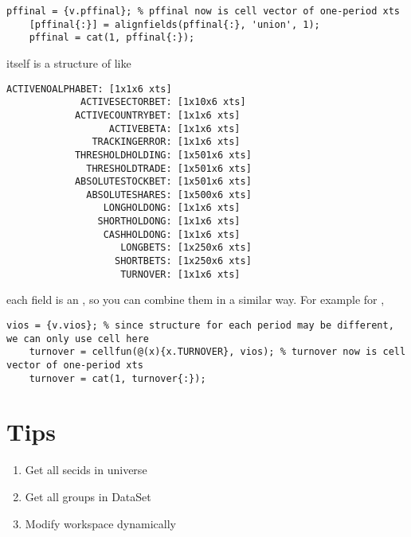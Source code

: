 \begin{lstlisting}[numbers=none]  
    pffinal = {v.pffinal}; % pffinal now is cell vector of one-period xts
    [pffinal{:}] = alignfields(pffinal{:}, 'union', 1);
    pffinal = cat(1, pffinal{:});
\end{lstlisting} 
 
 itself is a structure of like
 
\begin{lstlisting}[numbers=none] 
		    ACTIVENOALPHABET: [1x1x6 xts]
		     ACTIVESECTORBET: [1x10x6 xts]
		    ACTIVECOUNTRYBET: [1x1x6 xts]
		          ACTIVEBETA: [1x1x6 xts]
		       TRACKINGERROR: [1x1x6 xts]
		    THRESHOLDHOLDING: [1x501x6 xts]
		      THRESHOLDTRADE: [1x501x6 xts]
		    ABSOLUTESTOCKBET: [1x501x6 xts]
		      ABSOLUTESHARES: [1x500x6 xts]
		         LONGHOLDONG: [1x1x6 xts]
		        SHORTHOLDONG: [1x1x6 xts]
		         CASHHOLDONG: [1x1x6 xts]
		            LONGBETS: [1x250x6 xts]
		           SHORTBETS: [1x250x6 xts]
		            TURNOVER: [1x1x6 xts]
\end{lstlisting} 
 
each field is an , so you can combine them in a similar way. 
For example for , 

\begin{lstlisting}[numbers=none] 
    vios = {v.vios}; % since structure for each period may be different, we can only use cell here
    turnover = cellfun(@(x){x.TURNOVER}, vios); % turnover now is cell vector of one-period xts
    turnover = cat(1, turnover{:});
\end{lstlisting}


\section{Tips}
\begin{enumerate}
  \item Get all secids in universe
  \item Get all groups in DataSet
  \item Modify workspace dynamically
\end{enumerate}
